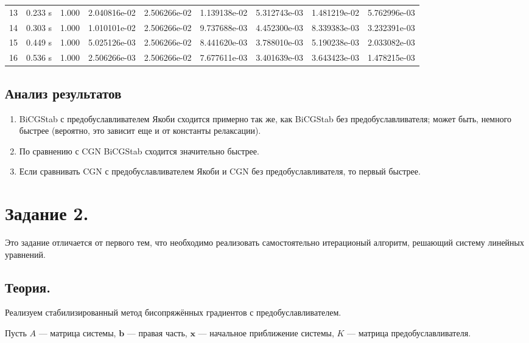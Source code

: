 \documentclass[12pt]{article}
\begin{document}
\begin{center}
\begin{tabular}{lllllllll}
13&      0.233 s&      1.000&      2.040816e-02&      2.506266e-02&      1.139138e-02&      5.312743e-03&      1.481219e-02&      5.762996e-03\\
14&      0.303 s&      1.000&      1.010101e-02&      2.506266e-02&      9.737688e-03&      4.452300e-03&      8.339383e-03&      3.232391e-03\\
15&      0.449 s&      1.000&      5.025126e-03&      2.506266e-02&      8.441620e-03&      3.788010e-03&      5.190238e-03&      2.033082e-03\\
16&      0.536 s&      1.000&      2.506266e-03&      2.506266e-02&      7.677611e-03&      3.401639e-03&      3.643423e-03&      1.478215e-03\\

\end{tabular}
\end{center}

\subsection{Анализ результатов}
\begin{enumerate}
\item
BiCGStab с предобуславливателем Якоби сходится примерно так же, как BiCGStab без пред\-обуслав\-ливателя; может быть, немного быстрее (вероятно, это зависит еще и от константы релаксации). 
\item
По сравнению с CGN BiCGStab сходится значительно быстрее. 
\item
Если сравнивать CGN с предобуславливателем Якоби и CGN без пред\-обуслав\-ливателя, то первый быстрее.

\end{enumerate}

\section{Задание 2.}

Это задание отличается от первого тем, что необходимо реализовать самостоятельно итерационый алгоритм, решающий систему линейных уравнений.

\subsection{Теория.}

Реализуем стабилизированный метод бисопряжённых
градиентов с предобуславливателем. 

Пусть $A$ --- матрица системы, $\mathbf b$ --- правая часть, $\mathbf x$ ---
начальное приближение системы, $K$ --- матрица предобуславливателя.
\end{document}
